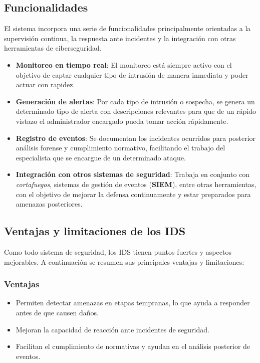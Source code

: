 \documentclass[11pt,a4paper,twoside]{report}
\begin{document}
\subsection{Funcionalidades}

El sistema incorpora una serie de funcionalidades principalmente orientadas a la supervisión continua, la respuesta ante incidentes y la integración con otras herramientas de ciberseguridad.

\begin{itemize}
	\item \textbf{Monitoreo en tiempo real}: El monitoreo está siempre activo con el objetivo de captar cualquier tipo de intrusión de manera inmediata y poder actuar con rapidez.
	
	\item \textbf{Generación de alertas}: Por cada tipo de intrusión o sospecha, se genera un determinado tipo de alerta con descripciones relevantes para que de un rápido vistazo el administrador encargado pueda tomar acción rápidamente.
	
	\item \textbf{Registro de eventos}: Se documentan los incidentes ocurridos para posterior análisis forense y cumplimiento normativo, facilitando el trabajo del especialista que se encargue de un determinado ataque.
	
	\item \textbf{Integración con otros sistemas de seguridad}: Trabaja en conjunto con \textit{cortafuegos}, sistemas de gestión de eventos (\textbf{SIEM}), entre otras herramientas, con el objetivo de mejorar la defensa continuamente y estar preparados para amenazas posteriores.
\end{itemize}




\subsection{Ventajas y limitaciones de los IDS}

Como todo sistema de seguridad, los IDS tienen puntos fuertes y aspectos mejorables. A continuación se resumen sus principales ventajas y limitaciones:

\subsubsection{Ventajas}

\begin{itemize}
	\item Permiten detectar amenazas en etapas tempranas, lo que ayuda a responder antes de que causen daños.
	\item Mejoran la capacidad de reacción ante incidentes de seguridad.
	\item Facilitan el cumplimiento de normativas y ayudan en el análisis posterior de eventos.
\end{itemize}
\end{document}
